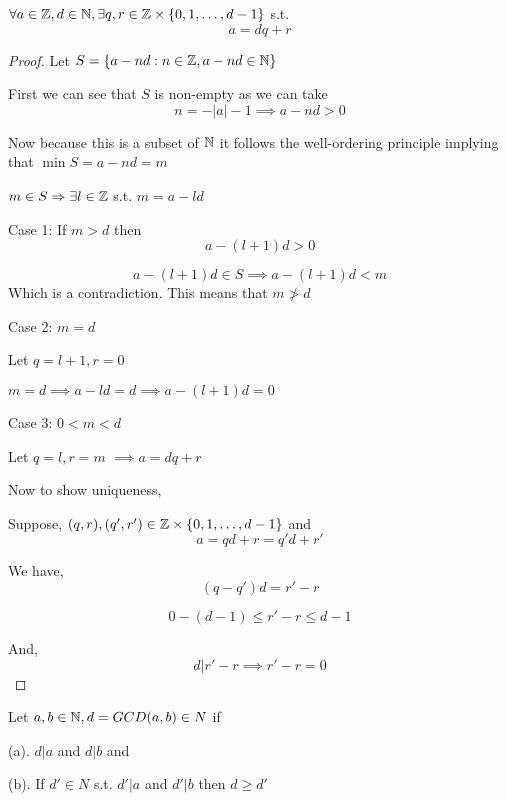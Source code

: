 \begin{theorem}
    $\forall a \in \mathbb{Z}, d \in \mathbb{N}, \exists q,r \in \mathbb{Z} \times  \{0,1,\dots,d - 1\}$ s.t. 
    $$ a = dq + r $$ 
\end{theorem}
\begin{proof}
    Let $S = \{a - nd : n \in \mathbb{Z}, a - nd \in \mathbb{N}\}$
     
    First we can see that $S$ is non-empty as we can take $$n = -|a| - 1 \implies a - nd > 0$$

    Now because this is a subset of $\mathbb{N}$ it follows the well-ordering principle implying that $\min S = a - nd = m$

    $m \in S \Rightarrow \exists l \in \mathbb{Z} $ s.t. $m = a - ld$

    Case 1: 
    If $m > d$ then $$a - (l + 1)d > 0$$
    
    $$ a - (l + 1)d \in S \implies a - (l+1)d < m$$  
    Which is a contradiction. This means that $m \not > d$

    Case 2: $m = d$

    Let $q = l + 1, r = 0$

     $m = d \implies a - ld = d \implies a - (l + 1) d = 0$

     Case 3:  $0 < m < d$
     
     Let $q = l,r = m$
     $\implies a = dq + r$


     Now  to show uniqueness,

     Suppose, $(q,r), (q',r') \in \mathbb{Z} \times \{0,1,\dots, d-1\}$ and 
     $$ a = qd + r = q'd + r' $$ 

     We have, 
     $$ (q - q')d = r' - r $$ 
     
     $$  0 - (d-1) \le r' - r \le d - 1 $$ 

     And, $$d | r' - r \implies r' - r = 0$$



    
\end{proof}
\begin{definition}
    Let $a,b\in \mathbb{N}, d = GCD(a,b) \in N$  if 

    (a). $d | a$ and $d | b$ and

    (b). If $d' \in N$ s.t.  $d' | a$ and  $d' | b$ then  $d \ge d'$
\end{definition}

